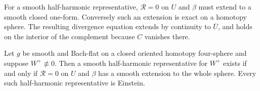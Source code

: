 For a smooth half-harmonic representative, \(\mathcal R=0\)
on \(U\) and \(\beta\) must extend to a smooth closed one-form.
Conversely such an extension is exact on a homotopy sphere.
The resulting divergence equation extends by continuity to
\(\overline U\), and holds on the interior of the complement
because \(C\) vanishes there.

\begin{theorem}
\label{alt:harmonic-scale}
Let \(g\) be smooth and Bach-flat on a closed oriented homotopy
four-sphere and suppose \(W^+\not\equiv0\). Then a smooth
half-harmonic representative for \(W^+\) exists if and only if
\(\mathcal R=0\) on \(U\) and \(\beta\) has a smooth extension
to the whole sphere. Every such half-harmonic representative
is Einstein.
\end{theorem}

